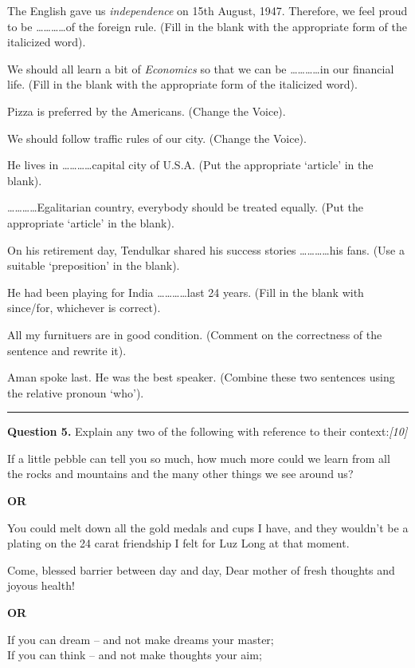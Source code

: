 \documentclass[11pt,a4paper]{article}
\newcommand{\pts}[1]{\hfill   \textit{[#1]}}
\begin{document}
\begin{parts}
  \item The English gave us   \textit{independence} on 15th August, 1947. Therefore, we feel proud to be \dots\dots\dots\dots of the foreign rule. (Fill in the blank with the appropriate form of the italicized word).
  \item We should all learn a bit of   \textit{Economics} so that we can be \dots\dots\dots\dots in our financial life. (Fill in the blank with the appropriate form of the italicized word).
  \item Pizza is preferred by the Americans. (Change the Voice).
  \item We should follow traffic rules of our city. (Change the Voice).
  \item He lives in \dots\dots\dots\dots capital city of U.S.A. (Put the appropriate `article' in the blank).
  \item \dots\dots\dots\dots Egalitarian country, everybody should be treated equally. (Put the appropriate `article' in the blank).
  \item On his retirement day, Tendulkar shared his success stories \dots\dots\dots\dots his fans. (Use a suitable `preposition' in the blank).
  \item He had been playing for India \dots\dots\dots\dots last 24 years. (Fill in the blank with since/for, whichever is correct).
  \item All my furnituers are in good condition. (Comment on the correctness of the sentence and rewrite it).
  \item Aman spoke last. He was the best speaker. (Combine these two sentences using the relative pronoun `who').
\end{parts}

\medskip\rule{\linewidth}{0.2pt}




\noindent   \textbf{Question 5.}
Explain any two of the following with reference to their context:\pts{10}

\begin{parts}
  \item If a little pebble can tell you so much, how much more could we learn from all the rocks and mountains and the many other things we see around us?
  \centerline{   \textbf{OR}}
  You could melt down all the gold medals and cups I have, and they wouldn't be a plating on the 24 carat friendship I felt for Luz Long at that moment.
  \item Come, blessed barrier between day and day, Dear mother of fresh thoughts and joyous health!
  \centerline{   \textbf{OR}}
  If you can dream -- and not make dreams your master;\\
  If you can think -- and not make thoughts your aim;
\end{parts}
\end{document}

